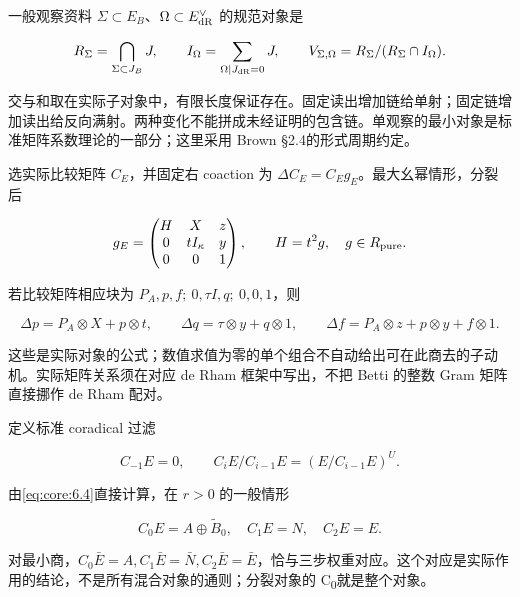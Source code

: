 \documentclass[11pt,a4paper,oneside]{ctexrep}
\theoremstyle{cnplain}
\theoremstyle{definition}
\theoremstyle{remark}
\begin{document}
一般观察资料 \(\Sigma\subset E_B\)、\(\Omega\subset E_{\rm dR}^\vee\) 的规范对象是

\begin{equation}
R_\Sigma=\bigcap_{\Sigma\subset J_B}J,\qquad
 I_\Omega=\sum_{\Omega|J_{\rm dR}=0}J,\qquad
 V_{\Sigma,\Omega}=R_\Sigma/(R_\Sigma\cap I_\Omega).     \label{eq:coaction:9.1}
\end{equation}

交与和取在实际子对象中，有限长度保证存在。固定读出增加链给单射；固定链增加读出给反向满射。两种变化不能拼成未经证明的包含链。单观察的最小对象是标准矩阵系数理论的一部分；这里采用 Brown §2.4的形式周期约定。\cite{brownperiods}

选实际比较矩阵 \(C_E\)，并固定右 coaction 为 \(\Delta C_E=C_Eg_E\)。最大幺幂情形，分裂后

\begin{equation}
g_E=\begin{pmatrix}H&X&z\\0&tI_\kappa&y\\0&0&1\end{pmatrix},
 \qquad H=t^2g,\quad g\in R_{\rm pure}.
\end{equation}

若比较矩阵相应块为 \(P_A,p,f;\ 0,\tau I,q;\ 0,0,1\)，则

\begin{equation}
\Delta p=P_A\otimes X+p\otimes t,\qquad
 \Delta q=\tau\otimes y+q\otimes1,\qquad
 \Delta f=P_A\otimes z+p\otimes y+f\otimes1.              \label{eq:coaction:9.2}
\end{equation}

这些是实际对象的公式；数值求值为零的单个组合不自动给出可在此商去的子动机。实际矩阵关系须在对应 de Rham 框架中写出，不把 Betti 的整数 Gram 矩阵直接挪作 de Rham 配对。

定义标准 coradical 过滤

\begin{equation}
C_{-1}E=0,\qquad C_iE/C_{i-1}E=(E/C_{i-1}E)^U.
\end{equation}

由\eqref{eq:core:6.4}直接计算，在 \(r>0\) 的一般情形

\begin{equation}
C_0E=A\oplus\widetilde B_0,\quad C_1E=N,\quad C_2E=E.
                                                               \label{eq:coaction:9.3}
\end{equation}

对最小商，\(C_0\bar E=A,C_1\bar E=\bar N,C_2\bar E=\bar E\)，恰与三步权重对应。这个对应是实际作用的结论，不是所有混合对象的通则；分裂对象的 C\textsubscript{0}就是整个对象。
\end{document}
